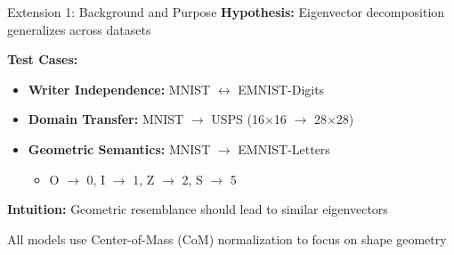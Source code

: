
\begin{frame}{Extension 1: Background and Purpose}
    \textbf{Hypothesis:} Eigenvector decomposition generalizes across datasets
    
    \vspace{0.5cm}
    \textbf{Test Cases:}
    \begin{itemize}
        \item \textbf{Writer Independence:} MNIST $\leftrightarrow$ EMNIST-Digits
        \item \textbf{Domain Transfer:} MNIST $\rightarrow$ USPS (16$\times$16 $\to$ 28$\times$28)
        \item \textbf{Geometric Semantics:} MNIST $\rightarrow$ EMNIST-Letters
        \begin{itemize}
            \item O $\to$ 0, I $\to$ 1, Z $\to$ 2, S $\to$ 5
        \end{itemize}
    \end{itemize}
    
    \vspace{0.5cm}
    \textbf{Intuition:} Geometric resemblance should lead to similar eigenvectors
    
    \vspace{0.3cm}
    \small
    All models use Center-of-Mass (CoM) normalization to focus on shape geometry
\end{frame}

